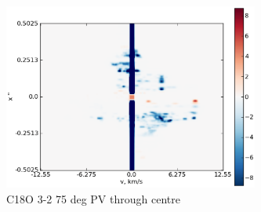 \documentclass[useAMS,usenatbib]{mn2e}
\begin{document}
%

\begin{figure}
  \includegraphics[width=84mm]{Figures/sim/imageC18O_3-2_75deg_PV_centre.eps}
  \caption{C18O 3-2 75 deg PV through centre}
\end{figure}

\bsp
%
\label{lastpage}
%
\end{document}
